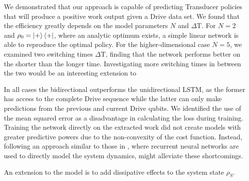 We demonstrated that our approach is capable of predicting Transducer policies that will produce a positive work output given a Drive data set.
We found that the efficiency greatly depends on the model parameters $N$ and $\Delta \mathrm{T}$.
For $N=2$ and $\rho_0 = \ket{+}\bra{+}$, where an analytic optimum exists, a simple linear network is able to reproduce the optimal policy.
For the higher-dimensional case $N=5$, we examined two switching times $\Delta \mathrm{T}$, finding that the network performs better on the shorter than the longer time.
Investigating more switching times in between the two would be an interesting extension to 

In all cases the bidirectional outperforms the unidirectional LSTM, as the former has access to the complete Drive sequence while the latter can only make predictions from the previous and current Drive qubits.
We identified the use of the mean squared error as a disadvantage in calculating the loss during training.
Training the network directly on the extracted work did not create models with greater predictive powers due to the non-convexity of the cost function.
Instead, following an approach similar to those in \cite{Banchi_2018, PhysRevX.10.011006}, where recurrent neural networks are used to directly model the system dynamics, might alleviate these shortcomings.

An extension to the model is to add dissipative effects to the system state $\rho_S$.